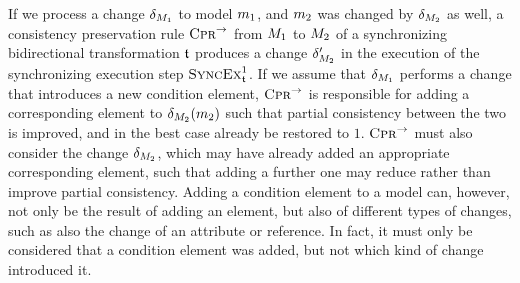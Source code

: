 If we process a change $\change{\metamodel{M}{1}}$ to model $\model{m}{1}$, and $\model{m}{2}$ was changed by $\change{\metamodel{M}{2}}$ as well,
a consistency preservation rule $\textsc{Cpr}_{}^{\rightarrow}$ from $\metamodel{M}{1}$ to $\metamodel{M}{2}$ of a synchronizing bidirectional transformation $\transformation{t}$ produces a change $\change{\metamodel{M}{2}}'$ in the execution of the synchronizing execution step $\function{SyncEx}_{\transformation{t}}^1$.
If we assume that $\change{\metamodel{M}{1}}$ performs a change that introduces a new condition element, $\textsc{Cpr}_{}^{\rightarrow}$ is responsible for adding a corresponding element to $\change{\metamodel{M}{2}}(\model{m}{2})$ such that partial consistency between the two is improved, and in the best case already be restored to $1$.
$\textsc{Cpr}_{}^{\rightarrow}$ must also consider the change $\change{\metamodel{M}{2}}$, which may have already added an appropriate corresponding element, such that adding a further one may reduce rather than improve partial consistency.
Adding a condition element to a model can, however, not only be the result of adding an element, but also of different types of changes, such as also the change of an attribute or reference.
In fact, it must only be considered that a condition element was added, but not which kind of change introduced it.


